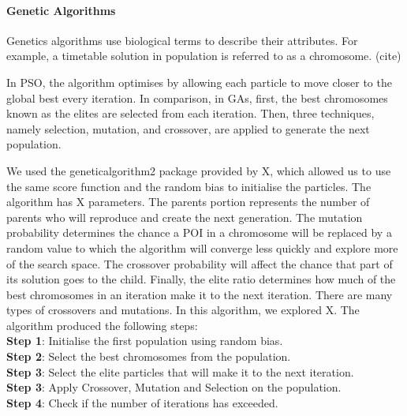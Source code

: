 \paragraph{Genetic Algorithms}

Genetics algorithms use biological terms to describe
their attributes. For example, a timetable solution in
population is referred to as a chromosome. (cite) 

In PSO, the algorithm optimises by allowing each
particle to move closer to the global best every
iteration. In comparison, in GAs, first, the best
chromosomes known as the elites are selected from each
iteration. Then, three techniques, namely selection,
mutation, and crossover, are applied to generate the
next population.

We used the geneticalgorithm2 package provided by X,
which allowed us to use the same score function and
the random bias to initialise the particles. The
algorithm has X parameters. The parents portion
represents the number of parents who will reproduce
and create the next generation. The mutation
probability determines the chance a POI in a
chromosome will be replaced by a random value to which
the algorithm will converge less quickly and explore
more of the search space. The crossover probability
will affect the chance that part of its solution goes
to the child. Finally, the elite ratio determines how
much of the best chromosomes in an iteration make it
to the next iteration.  There are many types of
crossovers and mutations. In this algorithm, we
explored X.  The algorithm produced the following
steps: \\
\textbf{Step 1}: Initialise the first population using random bias. \\
\textbf{Step 2}: Select the best chromosomes from the population. \\ 
\textbf{Step 3}: Select the elite particles that will make it to the next iteration.\\
\textbf{Step 3}: Apply Crossover, Mutation and Selection on the population. \\
\textbf{Step 4}: Check if the number of iterations has exceeded. 


